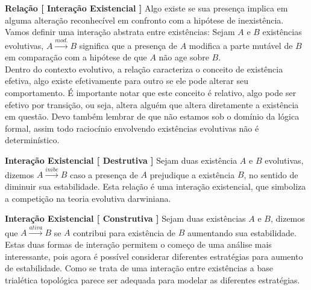 \documentclass[10pt,a4paper]{report}
\begin{document}
\hspace{\baselineskip}

\textbf{Relação [ Interação Existencial ]} Algo existe se sua presença implica em alguma alteração reconhecível em confronto com a hipótese de inexistência. Vamos definir uma interação abstrata entre existências: Sejam $A$ e $B$ existências evolutivas, $A \overset{mod.}{\rightarrow} B$ significa que a presença de $A$ modifica a parte mutável de $B$ em comparação com a hipótese de que $A$ não age sobre $B$. \\

Dentro do contexto evolutivo, a relação caracteriza o conceito de existência efetiva, algo existe efetivamente para outro se ele pode alterar seu comportamento. É importante notar que este conceito é relativo, algo pode ser efetivo por transição, ou seja, altera alguém que altera diretamente a existência em questão. Devo também lembrar de que não estamos sob o domínio da lógica formal, assim todo raciocínio envolvendo existências evolutivas não é determinístico.

\hspace{\baselineskip}

\textbf{Interação Existencial [ Destrutiva ]} Sejam duas existência $A$ e $B$ evolutivas, dizemos $A \overset{inibe}{\rightarrow} B$ caso a presença de $A$ prejudique a existência $B$, no sentido de diminuir sua estabilidade. Esta relação é uma interação existencial, que simboliza a competição na teoria evolutiva darwiniana.

\hspace{\baselineskip}

\textbf{Interação Existencial [ Construtiva ]} Sejam duas existências $A$ e $B$, dizemos que $A \overset{ativa}{\rightarrow} B$ se $A$ contribui para existência de $B$ aumentando sua estabilidade.\\

Estas duas formas de interação permitem o começo de uma análise mais interessante, pois agora é possível considerar diferentes estratégias para aumento de estabilidade. Como se trata de uma interação entre existências a base trialética topológica parece ser adequada para modelar as diferentes estratégias. \\
\end{document}
